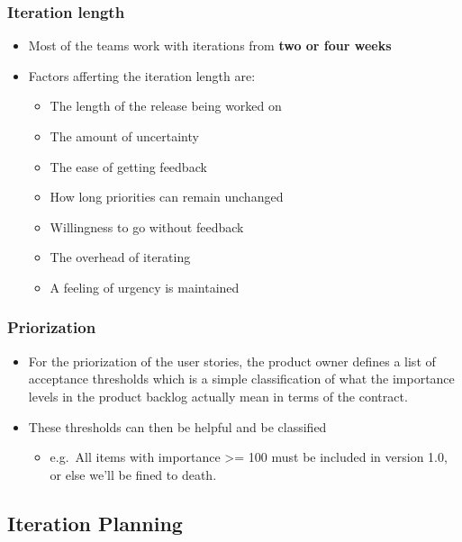 \hypertarget{iteration-length}{%
\subsubsection{Iteration length}\label{iteration-length}}

\begin{itemize}
\tightlist
\item
  Most of the teams work with iterations from \textbf{two or four weeks}
\item
  Factors afferting the iteration length are:

  \begin{itemize}
  \tightlist
  \item
    The length of the release being worked on
  \item
    The amount of uncertainty
  \item
    The ease of getting feedback
  \item
    How long priorities can remain unchanged
  \item
    Willingness to go without feedback
  \item
    The overhead of iterating
  \item
    A feeling of urgency is maintained
  \end{itemize}
\end{itemize}

\hypertarget{priorization}{%
\subsubsection{Priorization}\label{priorization}}

\begin{itemize}
\tightlist
\item
  For the priorization of the user stories, the product owner defines a
  list of acceptance thresholds which is a simple classification of what
  the importance levels in the product backlog actually mean in terms of
  the contract.
\item
  These thresholds can then be helpful and be classified

  \begin{itemize}
  \tightlist
  \item
    e.g.~All items with importance \textgreater{}= 100 must be included
    in version 1.0, or else we'll be fined to death.
  \end{itemize}
\end{itemize}

\hypertarget{iteration-planning}{%
\subsection{Iteration Planning}\label{iteration-planning}}

